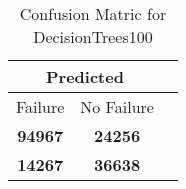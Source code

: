 \begin{table}[] 
\caption{Confusion Matric for DecisionTrees100} 
\label{Table: Prediction Accuracy-DMDDecisionTrees100OnlySunEKF-combinationReflection-Reflection} 
\centering 
\begin{tabular} 
 {@{}ccc@{}} 
\toprule 
\multicolumn{2}{c}{\textbf{Predicted}}
 \\ \midrule 
\multicolumn{1}{|c|}{Failure} & 
\multicolumn{1}{c|}{No Failure}
 \\ \midrule 
\multicolumn{1}{|c|}{\color{green}\textbf{94967}} & 
\multicolumn{1}{c|}{\color{red}\textbf{24256}}
 \\ \midrule 
\multicolumn{1}{|c|}{\color{red}\textbf{14267}} & 
\multicolumn{1}{c|}{\color{green}\textbf{36638}}
 \\ \bottomrule 
\end{tabular} 
\end{table} 
